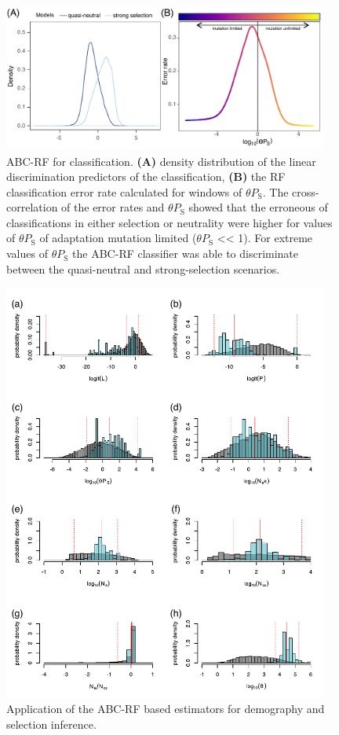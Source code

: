 \documentclass[a4paper, 12pt]{article}
\begin{document}
\begin{figure}[ht]
  \centering
  \label{fig:fig6}
  \includegraphics[width=0.95\textwidth]{Figures/lda_class_thetaPS.pdf}
  \captionsetup{font=footnotesize}
  \caption{ABC-RF for classification. \textbf{(A)} density distribution of the linear discrimination predictors of the classification,  \textbf{(B)} the RF classification error rate calculated for windows of $\theta P_{\mathrm{S}}$. The cross-correlation of the error rates and $\theta P_{\mathrm{S}}$ showed that the erroneous of classifications in either selection or neutrality were higher for values of $\theta P_{\mathrm{S}}$ of adaptation mutation limited ($\theta P_{\mathrm{S}}$ << 1). For extreme values of $\theta P_{\mathrm{S}}$ the ABC-RF classifier was able to discriminate between the quasi-neutral and strong-selection scenarios.}
\end{figure}

\begin{figure}[ht]
  \centering
  \label{fig:fig7}
  \includegraphics[width=0.95\textwidth]{Figures/pred_prior_post_placerita_mod.pdf}
  \captionsetup{font=footnotesize}
  \caption{Application of the ABC-RF based estimators for demography and selection inference.}
\end{figure}
\end{document}
